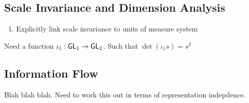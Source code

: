 

\subsection{Scale Invariance and Dimension Analysis}
\label{sec:scale-invariance}

\begin{enumerate}
\item Explicitly link scale invariance to units of measure system
\end{enumerate}

Need a function $\iota_1 : \mathsf{GL}_1 \to \mathsf{GL}_2$. Such that $\det (\iota_1 s) = s^2$

\subsection{Information Flow}
\label{sec:information-flow}

Blah blah blah. Need to work this out in terms of representation indepdence.

